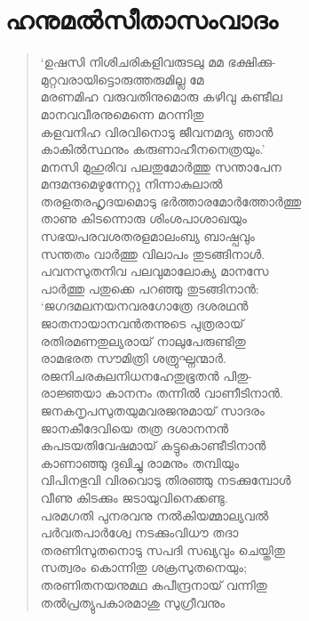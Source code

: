 \section{ഹനുമല്‍സീതാസംവാദം}

\begin{verse}
‘ഉഷസി നിശിചരികളിവരുടലു മമ ഭക്ഷിക്കു-\\
മുറ്റവരായിട്ടൊരുത്തരുമില്ല മേ\\
മരണമിഹ വരുവതിനുമൊരു കഴിവു കണ്ടീല\\
മാനവവീരനുമെന്നെ മറന്നിതു\\
കളവനിഹ വിരവിനൊടു ജീവനമദ്യ ഞാന്‍\\
കാകില്‍സ്ഥനും കരുണാഹീനനെത്രയും.’\\
മനസി മുഹുരിവ പലതുമോര്‍ത്തു സന്താപേന\\
മന്ദമന്ദമെഴുന്നേറ്റു നിന്നാകുലാല്‍\\
തരളതരഹൃദയമൊടു ഭര്‍ത്താരമോര്‍ത്തോര്‍ത്തു\\
താണു കിടന്നൊരു ശിംശപാശാഖയും\\
സഭയപരവശതരളമാലംബ്യ ബാഷ്പവും\\
സന്തതം വാര്‍ത്തു വിലാപം തുടങ്ങിനാള്‍.\\
പവനസുതനിവ പലവുമാലോക്യ മാനസേ\\
പാര്‍ത്തു പതുക്കെ പറഞ്ഞു തുടങ്ങിനാന്‍:\\
‘ജഗദമലനയനവരഗോത്രേ ദശരഥന്‍\\
ജാതനായാനവന്‍തന്നുടെ പുത്രരായ്\\
രതിരമണതുല്യരായ് നാലുപേരുണ്ടിതു\\
രാമഭരത സൗമിത്രി ശത്രുഘ്നന്മാര്‍.\\
രജനിചരകുലനിധനഹേതുഭൂതന്‍ പിതു-\\
രാജ്ഞയാ കാനനം തന്നില്‍ വാണീടിനാന്‍.\\
ജനകനൃപസുതയുമവരജനുമായ് സാദരം\\
ജാനകീദേവിയെ തത്ര ദശാനനന്‍\\
കപടയതിവേഷമായ് കട്ടുകൊണ്ടീടിനാന്‍\\
കാണാഞ്ഞു ദുഖിച്ചു രാമനും തമ്പിയും\\
വിപിനഭുവി വിരവൊടു തിരഞ്ഞു നടക്കുമ്പോള്‍\\
വീണു കിടക്കും ജടായുവിനെക്കണ്ടു.\\
പരമഗതി പുനരവനു നല്‍കിയമ്മാല്യവല്‍\\
പര്‍വതപാര്‍ശ്വേ നടക്കുംവിധൗ തദാ\\
തരണിസുതനൊടു സപദി സഖ്യവും ചെയ്തിതു\\
സത്വരം കൊന്നിതു ശക്രസുതനെയും;\\
തരണിതനയനുമഥ കപീന്ദ്രനായ് വന്നിതു\\
തല്‍പ്രത്യുപകാരമാശു സുഗ്രീവനും\\

\end{verse}

